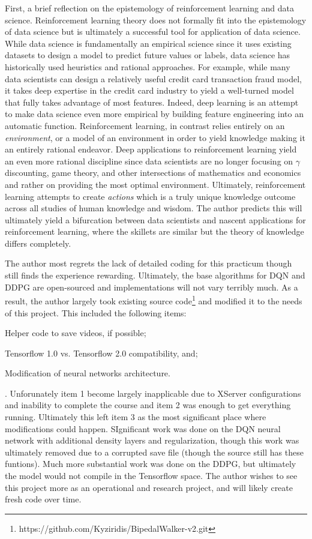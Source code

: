 \documentclass[doc, onecolumn, 12pt]{apa6}
\begin{document}
First, a brief reflection on the epistemology of reinforcement learning and data science. Reinforcement learning theory does not formally fit into the epistemology of data science but is ultimately a successful tool for application of data science. While data science is fundamentally an empirical science since it uses existing datasets to design a model to predict future values or labels, data science has historically used heuristics and rational approaches. For example, while many data scientists can design a relatively useful credit card transaction fraud model, it takes deep expertise in the credit card industry to yield a well-turned model that fully takes advantage of most features. Indeed, deep learning is an attempt to make data science even more empirical by building feature engineering into an automatic function. Reinforcement learning, in contrast relies entirely on an \emph{environment}, or a model of an environment in order to yield knowledge making it an entirely rational endeavor. Deep applications to reinforcement learning yield an even more rational discipline since data scientists are no longer focusing on $\gamma$ discounting, game theory, and other intersections of mathematics and economics and rather on providing the most optimal environment. Ultimately, reinforcement learning attempts to create \emph{actions} which is a truly unique knowledge outcome across all studies of human knowledge and wisdom. The author predicts this will ultimately yield a bifurcation between data scientists and nascent applications for reinforcement learning, where the skillets are similar but the theory of knowledge differs completely. 

The author most regrets the lack of detailed coding for this practicum though still finds the experience rewarding. Ultimately, the base algorithms for DQN\citep{DQN_22} and DDPG\citep{DDPG} are open-sourced and implementations will not vary terribly much. As a result, the author largely took existing source code\footnote{https://github.com/Kyziridis/BipedalWalker-v2.git} and modified it to the needs of this project. This included the following items: \begin{enumerate*}
\item Helper code to save videos, if possible;
\item Tensorflow 1.0 vs. Tensorflow 2.0 compatibility, and;
\item Modification of neural networks architecture.
\end{enumerate*}. Unforunately item 1 become largely inapplicable due to XServer configurations and inability to complete the course and item 2 was enough to get everything running. Ultimately this left item 3 as the most significant place where modifications could happen. SIgnificant work was done on the DQN neural network with additional density layers and regularization, though this work was ultimately removed due to a corrupted save file (though the source still has these funtions). Much more substantial work was done on the DDPG, but ultimately the model would not compile in the Tensorflow space. The author wishes to see this project more as an operational and research project, and will likely create fresh code over time. 
\end{document}

